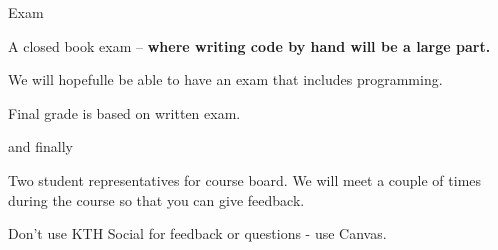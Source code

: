 \begin{frame}{Exam}

\pause A closed book exam -- {\bf where writing code by hand will be a large part.}

\vspace{20pt}

\pause We will hopefulle be able to have an exam that includes programming. 

\vspace{20pt}

\pause Final grade is based on written exam. 

\end{frame}

\begin{frame}{and finally}

  Two student representatives for course board. We will meet a couple
  of times during the course so that you can give feedback.

\pause\vspace{20pt}

Don't use KTH Social for feedback or questions - use Canvas. 

\end{frame}


